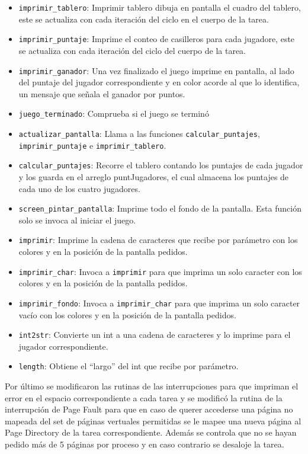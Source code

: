 \documentclass[10pt, a4paper]{article}
\begin{document}
\begin{itemize}
	\item \verb+imprimir_tablero+: Imprimir tablero dibuja en pantalla el cuadro del tablero, este se actualiza con cada iteraci\'on del ciclo en el cuerpo de la tarea.
	\item \verb+imprimir_puntaje+: Imprime el conteo de casilleros para cada jugadore, este se actualiza con cada iteraci\'on del ciclo del cuerpo de la tarea.
	\item \verb+imprimir_ganador+: Una vez finalizado el juego imprime en pantalla, al lado del puntaje del jugador correspondiente y en color acorde al que lo identifica, un mensaje que señala el ganador por puntos.
	\item \verb+juego_terminado+: Comprueba si el juego se termin\'o
	\item \verb+actualizar_pantalla+: Llama a las funciones \verb+calcular_puntajes+, \verb+imprimir_puntaje+ e \verb+imprimir_tablero+.
	\item \verb+calcular_puntajes+: Recorre el tablero contando los puntajes de cada jugador y los guarda en el arreglo puntJugadores, el cual almacena los puntajes de cada uno de los cuatro jugadores.
	\item \verb+screen_pintar_pantalla+: Imprime todo el fondo de la pantalla. Esta funci\'on solo se invoca al iniciar el juego.
	\item \verb+imprimir+: Imprime la cadena de caracteres que recibe por par\'ametro con los colores y en la posici\'on de la pantalla pedidos.
	\item \verb+imprimir_char+: Invoca a \verb+imprimir+ para que imprima un solo caracter con los colores y en la posici\'on de la pantalla pedidos.
	\item \verb+imprimir_fondo+: Invoca a \verb+imprimir_char+ para que imprima un solo caracter vac\'io con los colores y en la posici\'on de la pantalla pedidos.
	\item \verb+int2str+: Convierte un int a una cadena de caracteres y lo imprime para el jugador correspondiente.
	\item \verb+length+: Obtiene el ``largo'' del int que recibe por par\'ametro.
\end{itemize}

Por \'ultimo se modificaron las rutinas de las interrupciones para que impriman el error en el espacio correspondiente a cada tarea y se modific\'o la rutina de la interrupci\'on de Page Fault para que en caso de querer accederse una p\'agina no mapeada del set de p\'aginas vertuales permitidas se le mapee una nueva p\'agina al Page Directory de la tarea correspondiente. Además se controla que no se hayan pedido m\'as de 5 p\'aginas por proceso y en caso contrario se desaloje la tarea.
\end{document}
